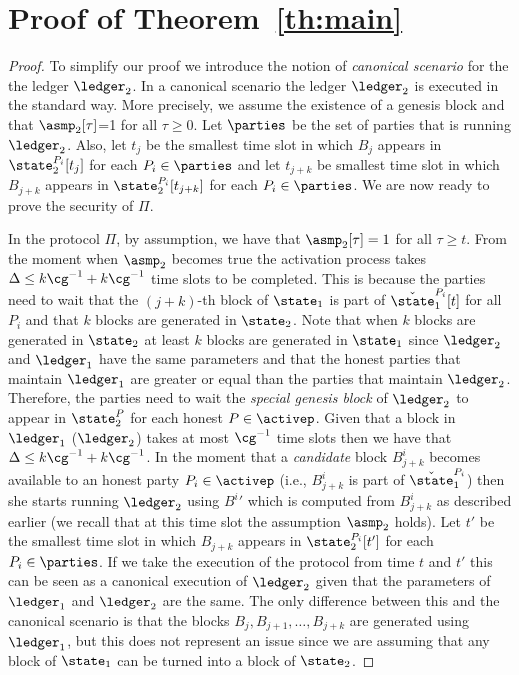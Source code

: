 \section{Proof of Theorem~\ref{th:main}}\label{se:proof}
\begin{proof}
To simplify our proof we introduce the notion of \emph{canonical scenario} for the the ledger $\ledger_2$. In a canonical scenario the ledger
$\ledger_2$ is executed in the standard way. More precisely, 
we assume the existence of a genesis block and that $\asmp_2[\tau]$=1 for all $\tau \geq 0$. Let $\parties$ be the set of parties that is running $\ledger_2$. Also, 
let $t_j$ be the smallest time slot in which $B_j$ appears in  $\state_2^{P_i}[t_j]$ for each $P_i\in\parties$ and let $t_{j+k}$ be smallest time slot in which $B_{j+k}$ appears in %
$\state_2^{P_i}[t_{j+k}]$ for each $P_i\in\parties$.
We are now ready to prove the security of $\Pi$.

In the protocol $\Pi$, by assumption, we have that $\asmp_2[\tau]=1$ for all $\tau \geq t$. 
From the moment when $\asmp_2$ becomes true the activation process takes $\Delta\leq k \cg^{-1} + k \cg^{-1}$  time slots to be completed.
This is because the parties need to wait that the $(j+k)$-th block of $\state_1$ is part of $\check \state_1^{P_i}[t]$  for all $P_i$ and that $k$ blocks are generated in $\state_2$. Note that when $k$ blocks are generated in $\state_2$ at least 
$k$ blocks are generated in $\state_1$ since $\ledger_2$ and $\ledger_1$ have the same parameters and that the honest parties that maintain $\ledger_1$ are greater or equal than the parties that maintain $\ledger_2$. Therefore, the parties need to wait the \emph{special genesis block} of $\ledger_2$ to appear 
in $\state_2^P$ for each honest $P\in\activep$. Given that a block in $\ledger_1$ ($\ledger_2$) takes at most $\cg^{-1}$ time slots then we have that $\Delta \leq k \cg^{-1} + k \cg^{-1}$.
In the moment that a \emph{candidate} block $B^i_{j+k}$ becomes available to an honest party $P_i\in\activep$ (i.e., $B^i_{j+k}$ is part of $\check \state_1^{P_i}$) then she starts running $\ledger_2$
using ${B^i}'$ which is computed from $B^i_{j+k}$ as described earlier (we recall that at this time slot the assumption $\asmp_2$ holds).
Let $t'$ be the smallest time slot in which $B_{j+k}$ appears in $ \state_2^{P_i}[t']$
 for each $P_i\in\parties$.
If we take the execution of the protocol from time $t$ and $t'$ this can be seen as a canonical execution of $\ledger_2$ given
that the parameters of $\ledger_1$ and $\ledger_2$ are the same. The only difference between this and the canonical scenario is
that the blocks $B_{j}, B_{j+1},\dots, B_{j+k}$  are generated using $\ledger_1$, but this does not represent an issue since we are assuming that
any block of $\state_1$ can be turned into a block of $\state_2$. \end{proof}









